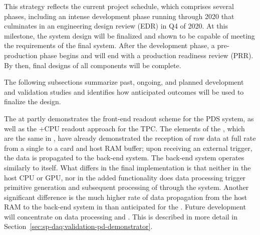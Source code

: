 This strategy reflects the current  project schedule, which
comprises several phases, including an intense development phase
running through 2020 that culminates in an engineering design
review (EDR) in Q4 of 2020. At this milestone, the system design will be
finalized and shown to be capable of meeting the requirements of the
final  system. After the development phase, a
pre-production phase begins and will end with a production readiness
review (PRR). By then, final designs of all components
will be complete.

The following subsections summarize past, ongoing, and planned
development and validation studies and identifies how anticipated outcomes
will be used to finalize the  design.

\label{sec:sp-daq:validation-pdune-felix}


The     at  partly demonstrates the front-end readout scheme for
the PDS system, as well as the   +CPU readout approach for the
TPC. The elements of the     , which are the
same in , have already demonstrated the
reception of raw data at full rate from a single  to a 
   card and    host RAM buffer; upon receiving an external trigger, the
data is propagated to the back-end system. The back-end system
operates similarly to  itself. What differs in the final 
implementation is that neither in the host CPU or
GPU, nor in the added  functionality does data processing  trigger primitive  generation and subsequent processing
of  through the  system. Another
significant difference is the much higher rate of data propagation from the
host RAM to the back-end system in  than anticipated for the . Future development
will concentrate on data processing and .  This is described in more detail in Section~\ref{sec:sp-daq:validation-pd-demonstrator}.

